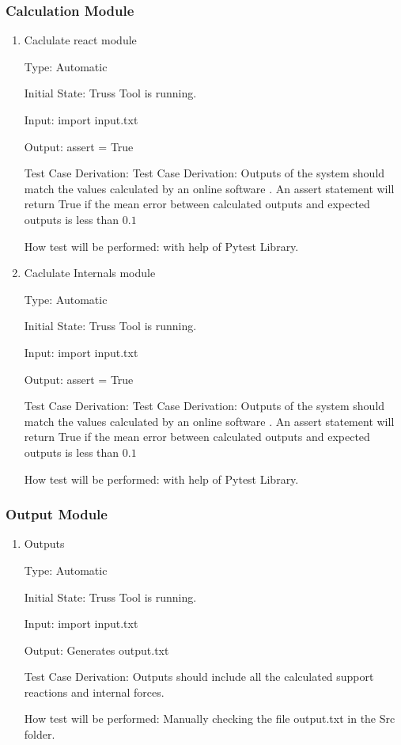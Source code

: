 \documentclass[12pt, titlepage]{article}
\begin{document}
\subsubsection{Calculation Module} \label{t_cal}


\begin{enumerate}

\item{Caclulate react module\\}

Type:  Automatic
					
Initial State: Truss Tool is running.
					
Input: import input.txt
					
Output: assert = True

Test Case Derivation: Test Case Derivation: Outputs of the system should match the values
calculated by an online software \cite{valdivia}. An assert statement
will return True if the mean error between calculated outputs and
expected outputs is less than $0.1$

How test will be performed: with help of Pytest Library.
 \item{Caclulate Internals module\\} 

Type:  Automatic
					
Initial State: Truss Tool is running.
					
Input: import input.txt
					
Output: assert = True

Test Case Derivation: Test Case Derivation: Outputs of the system should match the values
calculated by an online software \cite{valdivia}. An assert statement
will return True if the mean error between calculated outputs and
expected outputs is less than $0.1$

How test will be performed: with help of Pytest Library.   

\end{enumerate}
\subsubsection{Output Module} \label{t_out}


\begin{enumerate}

\item{Outputs\\}

Type:  Automatic
					
Initial State: Truss Tool is running.
					
Input: import input.txt
					
Output: Generates output.txt

Test Case Derivation: Outputs should include all the calculated support reactions and internal forces.

How test will be performed: Manually checking the file output.txt in the Src folder.
    
\end{enumerate}
\end{document}
